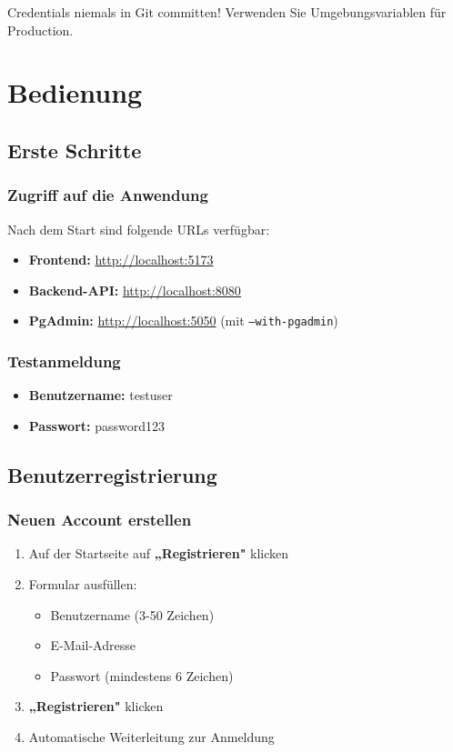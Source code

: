 \documentclass[a4paper,12pt]{article}
\begin{document}
\begin{warningbox}
Credentials niemals in Git committen! Verwenden Sie Umgebungsvariablen für Production.
\end{warningbox}

\section{Bedienung}

\subsection{Erste Schritte}

\subsubsection{Zugriff auf die Anwendung}
Nach dem Start sind folgende URLs verfügbar:
\begin{itemize}
    \item \textbf{Frontend:} \url{http://localhost:5173}
    \item \textbf{Backend-API:} \url{http://localhost:8080}
    \item \textbf{PgAdmin:} \url{http://localhost:5050} (mit \texttt{--with-pgadmin})
\end{itemize}

\subsubsection{Testanmeldung}
\begin{itemize}
    \item \textbf{Benutzername:} testuser
    \item \textbf{Passwort:} password123
\end{itemize}

\subsection{Benutzerregistrierung}

\subsubsection{Neuen Account erstellen}
\begin{enumerate}
    \item Auf der Startseite auf \textbf{„Registrieren"} klicken
    \item Formular ausfüllen:
    \begin{itemize}
        \item Benutzername (3-50 Zeichen)
        \item E-Mail-Adresse
        \item Passwort (mindestens 6 Zeichen)
    \end{itemize}
    \item \textbf{„Registrieren"} klicken
    \item Automatische Weiterleitung zur Anmeldung
\end{enumerate}
\end{document}
